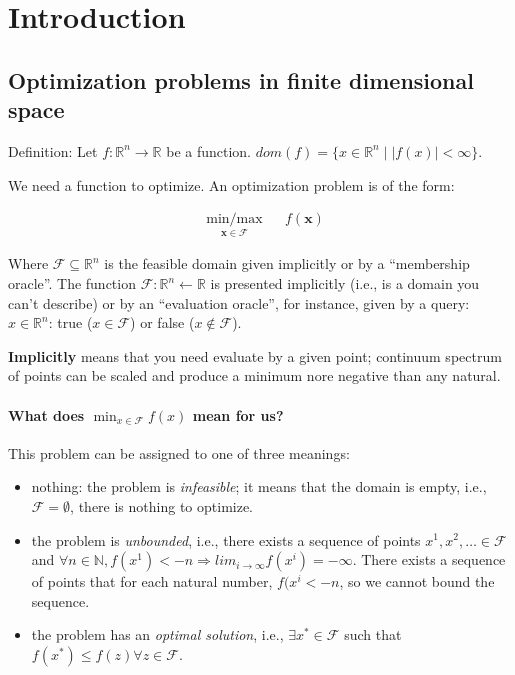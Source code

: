 \documentclass[main]{subfiles}
\begin{document}

\section{Introduction}

\subsection{Optimization problems in finite dimensional space}
Definition: Let $f: \mathbb{R}^{n} \rightarrow \mathbb{R}$ be a function.
$dom(f) = \{ x \in \mathbb{R}^{n} \mid \left| f(x) \right| < \infty \}$.

We need a function to optimize. An optimization problem is of the form: 

\begin{equation*}
\begin{aligned}
& \underset{\mathbf{x \in \mathcal{F}}}{\text{min/max}}
& & f(\mathbf{x})
\end{aligned}
\label{eq:sampleOptimizationProblem}
\end{equation*}

Where $\mathcal{F} \subseteq \mathbb{R}^{n}$ is the feasible domain given
implicitly or by a ``membership oracle''. The function
$\mathcal{F}: \mathbb{R}^{n} \leftarrow \mathbb{R}$ is presented implicitly
(i.e., is a domain you can't describe) or by an ``evaluation oracle'', for
instance, given by a query: $x \in \mathbb{R}^{n}$: true ($x \in \mathcal{F}$)
or false ($x \notin \mathcal{F}$).

\textbf{Implicitly} means that you need evaluate by a given point; continuum spectrum of points can be scaled and produce a minimum nore negative than any natural.

\paragraph{What does $\displaystyle \min_{x \in \mathcal{F}} f(x)$ mean for us?}
This problem can be assigned to one of three meanings:
\begin{itemize} \label{items:optimization-conclusions}
\item nothing: the problem is \emph{infeasible}; it means that the domain is
empty, i.e., $\mathcal{F} = \emptyset$, there is nothing to optimize.
\item the problem is \emph{unbounded}, i.e., there exists a sequence of
points $x^{1}, x^{2}, \dots \in \mathcal{F}$ and $\forall n \in \mathbb{N},
f(x^{1}) < -n \Rightarrow lim_{i \rightarrow \infty} f(x^{i}) = -\infty$.
There exists a sequence of points that for each natural number, $f(x^{i} < -n$,
so we cannot bound the sequence.
\item the problem has an \emph{optimal solution}, i.e., $\exists x^{*} \in
\mathcal{F}$ such that $f(x^{*}) \leq f(z) \forall z \in \mathcal{F}$.
\end{itemize}
\end{document}
